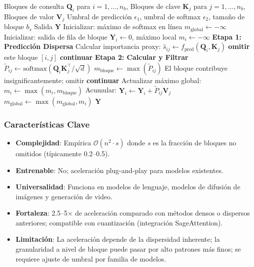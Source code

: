 \begin{algorithm}[H]
\caption{SpargeAttn: Filtrado Disperso de Dos Etapas por Bloques}
\begin{algorithmic}[1]
\Require Bloques de consulta $\mathbf{Q}_i$ para $i = 1, \ldots, n_b$, Bloques de clave $\mathbf{K}_j$ para $j = 1, \ldots, n_b$, Bloques de valor $\mathbf{V}_j$
\Require Umbral de predicción $\epsilon_1$, umbral de softmax $\epsilon_2$, tamaño de bloque $b_s$
\Ensure Salida $\mathbf{Y}$
\State Inicializar: máximo de softmax en línea $m_{\text{global}} \gets -\infty$
    \State Inicializar: salida de fila de bloque $\mathbf{Y}_i \gets 0$, máximo local $m_i \gets -\infty$
        \State \textbf{Etapa 1: Predicción Dispersa}
        \State Calcular importancia proxy: $\hat{s}_{ij} \gets f_{\text{pred}}(\mathbf{Q}_i, \mathbf{K}_j)$
            \State \textbf{omitir} este bloque $[i,j]$  
            \State \textbf{continuar} 
        \EndIf
        \State \textbf{Etapa 2: Calcular y Filtrar}
        \State $\tilde{P}_{ij} \gets \text{softmax}(\mathbf{Q}_i \mathbf{K}_j^\top / \sqrt{d})$
        \State $m_{\text{bloque}} \gets \max(\tilde{P}_{ij})$
            \State El bloque contribuye insignificantemente; omitir  
            \State \textbf{continuar}
        \EndIf
        \State Actualizar máximo global: $m_i \gets \max(m_i, m_{\text{bloque}})$
        \State Acumular: $\mathbf{Y}_i \gets \mathbf{Y}_i + \tilde{P}_{ij} \mathbf{V}_j$
    \EndFor
    \State $m_{\text{global}} \gets \max(m_{\text{global}}, m_i)$
\EndFor
\Return $\mathbf{Y}$
\end{algorithmic}
\end{algorithm}

\subsubsection{Características Clave}

\begin{itemize}[leftmargin=*]
    \item \textbf{Complejidad}: Empírica $\mathcal{O}(n^2 \cdot s)$ donde $s$ es la fracción de bloques no omitidos (típicamente 0.2--0.5).
    \item \textbf{Entrenable}: No; aceleración plug-and-play para modelos existentes.
    \item \textbf{Universalidad}: Funciona en modelos de lenguaje, modelos de difusión de imágenes y generación de video.
    \item \textbf{Fortaleza}: 2.5--5$\times$ de aceleración comparado con métodos densos o dispersos anteriores; compatible con cuantización (integración SageAttention).
    \item \textbf{Limitación}: La aceleración depende de la dispersidad inherente; la granularidad a nivel de bloque puede pasar por alto patrones más finos; se requiere ajuste de umbral por familia de modelos.
\end{itemize}

